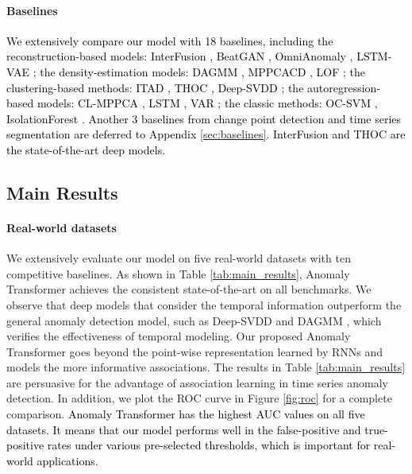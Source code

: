 \documentclass{article} %
\newcommand{\update}[1]{{\textcolor{black}{#1}}}
\begin{document}
\paragraph{Baselines} \update{We extensively compare our model with 18 baselines, including the reconstruction-based models: InterFusion \citeyearpar{DBLP:conf/kdd/LiZHSJWP21}, BeatGAN \citeyearpar{Zhou2019BeatGANAR}, OmniAnomaly \citeyearpar{Su2019RobustAD}, LSTM-VAE \citeyearpar{DBLP:journals/corr/abs-1711-00614}; the density-estimation models: DAGMM \citeyearpar{DBLP:conf/iclr/ZongSMCLCC18}, MPPCACD \citeyearpar{Yairi2017ADH}, LOF \citeyearpar{DBLP:conf/sigmod/BreunigKNS00}; the clustering-based methods: ITAD \citeyearpar{Shin2020ITADIT}, THOC \citeyearpar{DBLP:conf/nips/ShenLK20}, Deep-SVDD \citeyearpar{DBLP:conf/icml/RuffGDSVBMK18}; the autoregression-based models: CL-MPPCA \citeyearpar{Tariq2019DetectingAI}, LSTM \citeyearpar{Hundman2018DetectingSA}, VAR \citeyearpar{Anderson1976TimeSeries2E}; the classic methods: OC-SVM \citeyearpar{Tax2004SupportVD}, IsolationForest \citeyearpar{Liu2008IsolationF}. Another 3 baselines from change point detection and time series segmentation are deferred to Appendix \ref{sec:baselines}. InterFusion \citeyearpar{DBLP:conf/kdd/LiZHSJWP21} and THOC \citeyearpar{DBLP:conf/nips/ShenLK20} are the state-of-the-art deep models.}


\vspace{-2pt}
\subsection{Main Results}
\vspace{-2pt}
\paragraph{Real-world datasets} We extensively evaluate our model on five real-world datasets with ten competitive baselines. As shown in Table \ref{tab:main_results}, Anomaly Transformer achieves the consistent state-of-the-art on all benchmarks. 
We observe that deep models that consider the temporal information outperform the general anomaly detection model, such as Deep-SVDD \citep{DBLP:conf/icml/RuffGDSVBMK18} and DAGMM \citep{DBLP:conf/iclr/ZongSMCLCC18}, which verifies the effectiveness of temporal modeling. Our proposed Anomaly Transformer goes beyond the point-wise representation learned by RNNs and models the more informative associations. The results in Table \ref{tab:main_results} are persuasive for the advantage of association learning in time series anomaly detection. In addition, we plot the ROC curve in Figure \ref{fig:roc} for a complete comparison. \update{Anomaly Transformer has the highest AUC values on all five datasets. It means that our model performs well in the false-positive and true-positive rates under various pre-selected thresholds, which is important for real-world applications.} %
\end{document}
